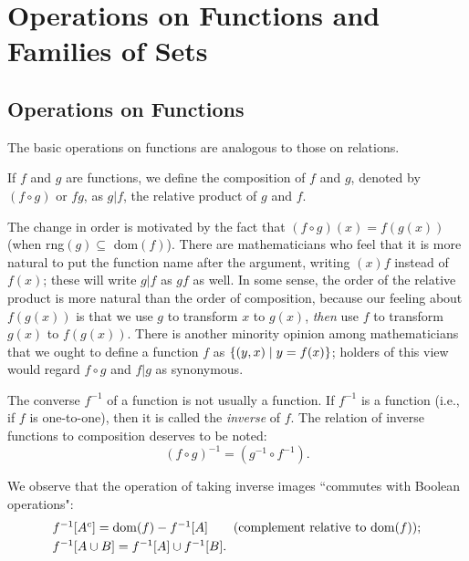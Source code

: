 \chapter[Operations on Functions]{Operations on Functions and\\
Families of Sets}

\section{Operations on Functions}

The basic operations on functions are analogous to those on
relations.  

\begin{definition}
  If $f$ and $g$ are functions, we define the {\upshape
  composition\/} of $f$ and $g$, denoted by 
  $(f \circ g)$ or $fg$, as $g|f$, the relative product
  of $g$ and $f$. 
\end{definition}

The change in order is motivated by the fact that $(f \circ g)(x) =
f(g(x))$ (when rng$(g)\subseteq $ dom$(f)$).  There are mathematicians
who feel that it is more natural to put the function name after
the argument, writing $(x)f$ instead of $f(x)$; these will write $g|f$ as
$gf$ as well.  In some sense, the order of the relative product is more natural than the order of composition, because our feeling
about $f(g(x))$ is that we use $g$ to transform $x$ to $g(x)$, {\itshape
then\/}
use $f$ to transform $g(x)$ to $f(g(x))$.  There is another minority
opinion among mathematicians that we ought to define a function $f$ as
$\{(y,x)\mid y=f(x)\}$; holders of this view would regard $f \circ g$ and $f|g$ as synonymous.

The converse $f^{-1}$ of a
function is not usually a function.  If $f^{-1}$ is a function
(i.e., if $f$ is one-to-one), then it is called the
{\itshape inverse\/} of $f$.  The relation of
inverse functions to composition deserves to be noted:
\begin{displaymath}
 (f \circ g)^{-1} = (g^{-1} \circ f^{-1}).
\end{displaymath}
 
We observe that the operation of taking inverse images
``commutes with Boolean operations":
\begin{displaymath}
 \begin{array}{l}
  f^{-1}[A^c] = \dom(f) - f^{-1}[A]\qquad\mbox{(complement\index{complement}
   relative to $\dom(f)$)};\\[1mm]
  f^{-1}[A \cup B] = f^{-1}[A] \cup f^{-1}[B].
 \end{array}
\end{displaymath}

